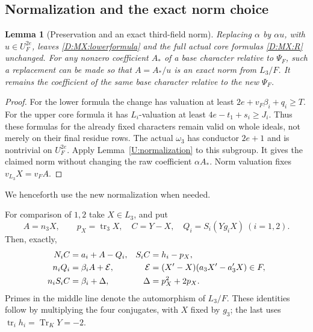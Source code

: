 \documentclass[11pt]{amsart}
\newtheorem{lemma}[theorem]{Lemma}
\theoremstyle{definition}
\theoremstyle{remark}
\newcommand{\Tr}{\operatorname{Tr}}
\begin{document}
\subsection{Normalization and the exact norm choice}
\begin{lemma}[Preservation and an exact third-field norm]\label{D:MX:freedom}
Replacing $\alpha$ by $\alpha u$, with $u\in U_F^{2e}$, leaves
\eqref{D:MX:lowerformula} and the full actual core formulas \eqref{D:MX:R} unchanged.
For any nonzero coefficient $A_*$ of a base character relative to $\Psi_F$,
such a replacement can be made so that $A=A_*/u$ is an exact norm from
$L_3/F$. It remains the coefficient of the same base character relative
to the new $\Psi_F$.
\end{lemma}
\begin{proof}
For the lower formula the change has valuation at least
$2e+v_F\beta_i+q_i\ge T$. For the upper core formula it has
$L_i$-valuation at least $4e-t_1+s_i\ge J_i$.
Thus these formulas for the already fixed characters remain valid on
whole ideals, not merely on their final residue rows.
The actual $\omega_3$ has conductor $2e+1$ and is nontrivial on
$U_F^{2e}$. Apply Lemma~\ref{U:normalization} to this subgroup.
It gives the claimed norm without changing the raw coefficient
$\alpha A_*$. Norm valuation fixes $v_{L_3}X=v_FA$.
\end{proof}
We henceforth use the new normalization when needed.


For comparison of $1,2$ take $X\in L_3$, and put
\[
 A=n_3X,\qquad p_X=\operatorname{tr}_3X,\quad C=Y-X,\quad
 Q_i=S_i(Yg_iX)\ (i=1,2).
\]
Then, exactly,
\begin{align}\label{D:MX:adjust-identities}
 N_iC&=a_i+A-Q_i,&S_iC&=h_i-p_X,\notag\\
 n_iQ_i&=\beta_i A+\mathcal E,&
 \mathcal E&=(X'-X)(a_3X'-a_3'X)\in F,\\
 n_iS_iC&=\beta_i+\Delta,&\Delta&=p_X^2+2p_X.\label{D:MX:Delta}
\end{align}
Primes in the middle line denote the automorphism of $L_3/F$.
These identities follow by multiplying the four conjugates, with $X$
fixed by $g_3$; the last uses $\operatorname{tr}_ih_i=\Tr_KY=-2$.
\end{document}
